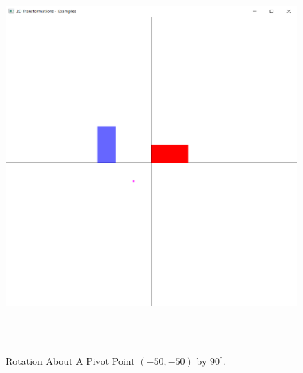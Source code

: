 \documentclass[12pt, a4]{article}
\begin{document}
\subsection*{}
\begin{figure}[h]
\centering
\caption{Rotation About A Pivot Point $(-50, -50)$ by $90^{\circ}$.}
\includegraphics[height=15cm, width=15cm]{Outputs/Output-4.png}
\end{figure}

\newpage
\end{document}
